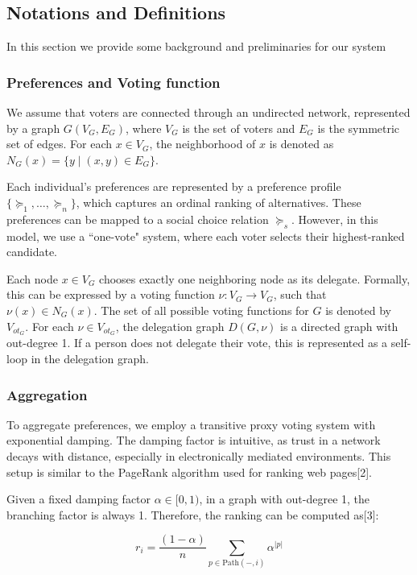 \documentclass{article} %
\begin{document}
\subsection{Notations and Definitions}
In this section we provide some background and preliminaries for our system
\subsubsection{Preferences and Voting function}
We assume that voters are connected through an undirected network, represented by a graph \( G(V_G, E_G) \), where \( V_G \) is the set of voters and \( E_G \) is the symmetric set of edges. For each \( x \in V_G \), the neighborhood of \( x \) is denoted as \( N_G(x) = \{ y \mid (x, y) \in E_G \} \).

Each individual's preferences are represented by a preference profile \( \{\succeq_1, \dots, \succeq_n \} \), which captures an ordinal ranking of alternatives. These preferences can be mapped to a social choice relation \( \succeq_s \). However, in this model, we use a ``one-vote" system, where each voter selects their highest-ranked candidate.

Each node \( x \in V_G \) chooses exactly one neighboring node as its delegate. Formally, this can be expressed by a voting function \( \nu : V_G \to V_G \), such that \( \nu(x) \in N_G(x) \). The set of all possible voting functions for \( G \) is denoted by \( V_{ot_G} \). For each \( \nu \in V_{ot_G} \), the delegation graph \( D(G, \nu) \) is a directed graph with out-degree 1. If a person does not delegate their vote, this is represented as a self-loop in the delegation graph.

\subsubsection{Aggregation}
To aggregate preferences, we employ a transitive proxy voting system with exponential damping. The damping factor is intuitive, as trust in a network decays with distance, especially in electronically mediated environments. This setup is similar to the PageRank algorithm used for ranking web pages[2].

Given a fixed damping factor \( \alpha \in [0,1) \), in a graph with out-degree 1, the branching factor is always 1. Therefore, the ranking can be computed as[3]:

\[
r_i = \frac{(1 - \alpha)}{n} \sum_{p \in \text{Path}(-, i)} \alpha^{|p|}
\]
\end{document}
